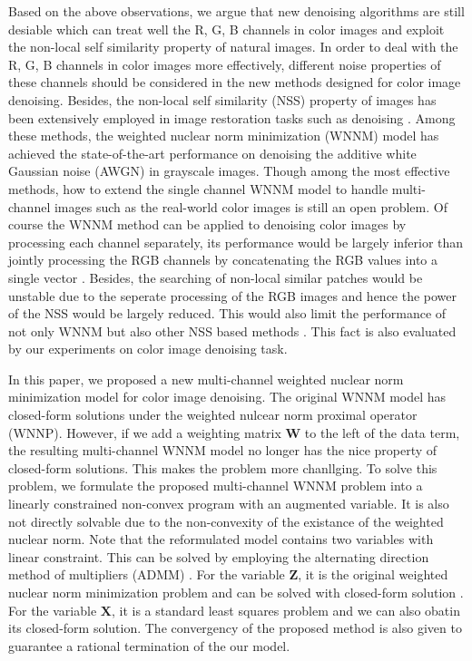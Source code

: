 \documentclass[10pt,twocolumn,letterpaper]{article}
\begin{document}
Based on the above observations, we argue that new denoising algorithms are still desiable which can treat well the R, G, B channels in color images and exploit the non-local self similarity property of natural images. In order to deal with the R, G, B channels in color images more effectively, different noise properties of these channels should be considered in the new methods designed for color image denoising. Besides, the non-local self similarity (NSS) property of images has been extensively employed in image restoration tasks such as denoising \cite{ksvd,lssc,ncsr,nlm,bm3d,pgpd,wnnm}. Among these methods, the weighted nuclear norm minimization (WNNM) model has achieved the state-of-the-art performance on denoising the additive white Gaussian noise (AWGN) in grayscale images. Though among the most effective methods, how to extend the single channel WNNM model to handle multi-channel images such as the real-world color images is still an open problem. Of course the WNNM method can be applied to denoising color images by processing each channel separately, its performance would be largely inferior than jointly processing the RGB channels by concatenating the RGB values into a single vector \cite{mairal2008sparse}. Besides, the searching of non-local similar patches would be unstable due to the seperate processing of the RGB images and hence the power of the NSS would be largely reduced. This would also limit the performance of not only WNNM but also other NSS based methods \cite{lssc,ncsr,nlm,bm3d,pgpd}. This fact is also evaluated by our experiments on color image denoising task. 

In this paper, we proposed a new multi-channel weighted nuclear norm minimization model for color image denoising. The original WNNM model has closed-form solutions under the weighted nulcear norm proximal operator (WNNP). However, if we add a weighting matrix $\mathbf{W}$ to the left of the data term, the resulting multi-channel WNNM model no longer has the nice property of closed-form solutions. This makes the problem more chanllging. To solve this problem, we formulate the proposed multi-channel WNNM problem into a linearly constrained non-convex program with an augmented variable. It is also not directly solvable due to the non-convexity of the existance of the weighted nuclear norm. Note that the reformulated model contains two variables with linear constraint. This can be solved by employing the alternating direction method of multipliers (ADMM) \cite{admm}. For the variable $\mathbf{Z}$, it is the original weighted nuclear norm minimization problem and can be solved with closed-form solution \cite{wnnm,lugsvt}. For the variable $\mathbf{X}$, it is a standard least squares problem and we can also obatin its closed-form solution. The convergency of the proposed method is also given to guarantee a rational termination of the our model. 
\end{document}
